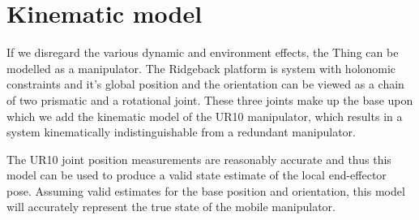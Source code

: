 \documentclass[times, utf8, diplomski, english]{fer}
\begin{document}
\section{Kinematic model}\label{section:Kinematics}
If we disregard the various dynamic and environment effects, the Thing can be modelled as a manipulator.
The Ridgeback platform is system with holonomic constraints and it's global position and the orientation can be viewed as a chain of two prismatic and a rotational joint. 
These three joints make up the base upon which we add the kinematic model of the UR10 manipulator, which results in a system kinematically indistinguishable from a redundant manipulator.

The UR10 joint position measurements are reasonably accurate and thus this model can be used to produce a valid state estimate of the local end-effector pose.
Assuming valid estimates for the base position and orientation, this model will accurately represent the true state of the mobile manipulator.
\end{document}
